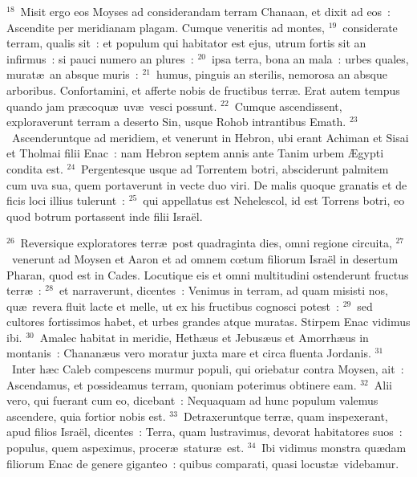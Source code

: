 ${}^{18}$~Misit ergo eos Moyses ad considerandam terram Chanaan, et dixit ad eos~: Ascendite per meridianam plagam. Cumque veneritis ad montes,
${}^{19}$~considerate terram, qualis sit~: et populum qui habitator est ejus, utrum fortis sit an infirmus~: si pauci numero an plures~:
${}^{20}$~ipsa terra, bona an mala~: urbes quales, murat\ae\ an absque muris~:
${}^{21}$~humus, pinguis an sterilis, nemorosa an absque arboribus. Confortamini, et afferte nobis de fructibus terr\ae . Erat autem tempus quando jam pr\ae coqu\ae\ uv\ae\ vesci possunt.
${}^{22}$~Cumque ascendissent, exploraverunt terram a deserto Sin, usque Rohob intrantibus Emath.
${}^{23}$~Ascenderuntque ad meridiem, et venerunt in Hebron, ubi erant Achiman et Sisai et Tholmai filii Enac~: nam Hebron septem annis ante Tanim urbem \AE gypti condita est.
${}^{24}$~Pergentesque usque ad Torrentem botri, absciderunt palmitem cum uva sua, quem portaverunt in vecte duo viri. De malis quoque granatis et de ficis loci illius tulerunt~:
${}^{25}$~qui appellatus est Nehelescol, id est Torrens botri, eo quod botrum portassent inde filii Isra\"el.


${}^{26}$~Reversique exploratores terr\ae\ post quadraginta dies, omni regione circuita,
${}^{27}$~venerunt ad Moysen et Aaron et ad omnem cœtum filiorum Isra\"el in desertum Pharan, quod est in Cades. Locutique eis et omni multitudini ostenderunt fructus terr\ae~:
${}^{28}$~et narraverunt, dicentes~: Venimus in terram, ad quam misisti nos, qu\ae\ revera fluit lacte et melle, ut ex his fructibus cognosci potest~:
${}^{29}$~sed cultores fortissimos habet, et urbes grandes atque muratas. Stirpem Enac vidimus ibi.
${}^{30}$~Amalec habitat in meridie, Heth\ae us et Jebus\ae us et Amorrh\ae us in montanis~: Chanan\ae us vero moratur juxta mare et circa fluenta Jordanis.
${}^{31}$~Inter h\ae c Caleb compescens murmur populi, qui oriebatur contra Moysen, ait~: Ascendamus, et possideamus terram, quoniam poterimus obtinere eam.
${}^{32}$~Alii vero, qui fuerant cum eo, dicebant~: Nequaquam ad hunc populum valemus ascendere, quia fortior nobis est.
${}^{33}$~Detraxeruntque terr\ae , quam inspexerant, apud filios Isra\"el, dicentes~: Terra, quam lustravimus, devorat habitatores suos~: populus, quem aspeximus, procer\ae\ statur\ae\ est.
${}^{34}$~Ibi vidimus monstra qu\ae dam filiorum Enac de genere giganteo~: quibus comparati, quasi locust\ae\ videbamur.

